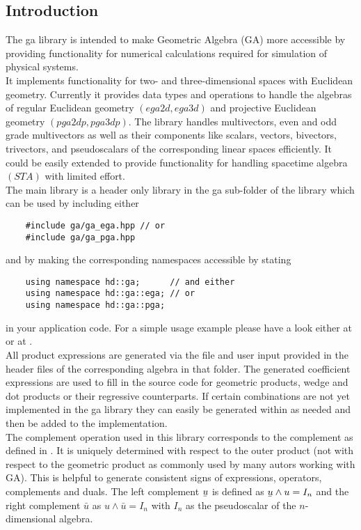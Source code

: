 \subsection{Introduction}
\label{intro}

The ga library is intended to make Geometric Algebra (GA) more accessible by providing
functionality for numerical calculations required for simulation of physical systems. \\

It implements functionality for two- and three-dimensional spaces with Euclidean geometry.
Currently it provides data types and operations to handle the algebras of regular
Euclidean geometry $(ega2d, ega3d)$ and projective Euclidean geometry $(pga2dp, pga3dp)$.
The library handles multivectors, even and odd grade multivectors as well as their
components like scalars, vectors, bivectors, trivectors, and pseudoscalars of the
corresponding linear spaces efficiently. It could be easily extended to provide
functionality for handling spacetime algebra $(STA)$ with limited effort. \\

The main library is a header only library in the ga sub-folder of the library which can be
used by including either
\begin{verbatim}
    #include ga/ga_ega.hpp // or
    #include ga/ga_pga.hpp
\end{verbatim}
and by making the corresponding namespaces accessible by stating
\begin{verbatim}
    using namespace hd::ga;      // and either
    using namespace hd::ga::ega; // or
    using namespace hd::ga::pga;
\end{verbatim}
in your application code. For a simple usage example please have a look either at
 or at .
\\

All product expressions are generated via the file  and
user input provided in the header files of the corresponding algebra in that folder. The
generated coefficient expressions are used to fill in the source code for geometric
products, wedge and dot products or their regressive counterparts. If certain combinations
are not yet implemented in the ga library they can easily be generated within
 as needed and then be added to the implementation. \\

The complement operation used in this library corresponds to the complement as defined in
\cite{Lengyel_pga-illuminated:2024}. It is uniquely determined with respect to the outer
product (not with respect to the geometric product as commonly used by many autors working
with GA). This is helpful to generate consistent signs of expressions, operators,
complements and duals. The left complement $\ubar{u}$ is defined as $\ubar{u} \wedge u =
I_n$ and the right complement $\bar{u}$ as $u \wedge \bar{u} = I_n$ with $I_n$ as the
pseudoscalar of the $n$-dimensional algebra. \\

